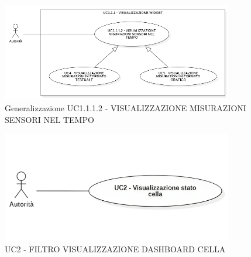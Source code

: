 





\begin{figure}[H]
    \centering
    \includegraphics[width=0.9\textwidth]{../Images/uc1.1.1.2Gen.PNG}
    \caption{Generalizzazione UC1.1.1.2 - VISUALIZZAZIONE MISURAZIONI SENSORI NEL TEMPO}
    \label{fig:UC3_gen}
\end{figure}







\begin{figure}[H]
    \centering
    \includegraphics[width=0.9\textwidth]{../Images/uc2.png}
    \caption{UC2 - FILTRO VISUALIZZAZIONE DASHBOARD CELLA}
    \label{fig:UC2}
\end{figure}

